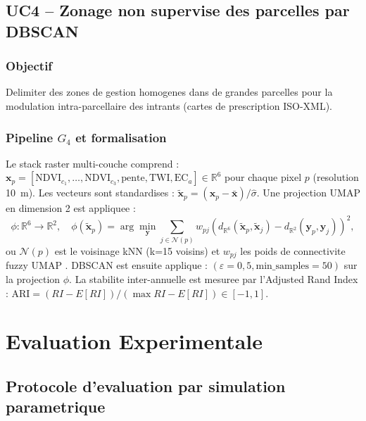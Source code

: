 \documentclass[12pt,a4paper]{article}
\theoremstyle{plain}
\theoremstyle{definition}
\theoremstyle{remark}
\newcommand{\R}{\mathbb{R}}
\begin{document}
	\subsection{UC4 -- Zonage non supervise des parcelles par DBSCAN}
	\label{subsec:uc4}
	
	\subsubsection{Objectif}
	
	Delimiter des zones de gestion homogenes dans de grandes parcelles
	pour la modulation intra-parcellaire des intrants (cartes de
	prescription ISO-XML).
	
	\subsubsection{Pipeline $G_4$ et formalisation}
	
	Le stack raster multi-couche comprend :
	$\bm{x}_p = [\text{NDVI}_{c_1}, \ldots, \text{NDVI}_{c_3},
	\text{pente}, \text{TWI}, \text{EC}_a] \in \R^6$
	pour chaque pixel $p$ (resolution 10~m).
	Les vecteurs sont standardises :
	$\tilde{\bm{x}}_p = (\bm{x}_p - \bar{\bm{x}}) / \hat\sigma$.
	Une projection UMAP en dimension 2 est appliquee :
	\begin{equation}
		\phi : \R^6 \to \R^2, \quad
		\phi(\tilde{\bm{x}}_p) = \arg\min_{\bm{y}}
		\sum_{j \in \mathcal{N}(p)} w_{pj} (d_{\R^6}(\tilde{\bm{x}}_p,
		\tilde{\bm{x}}_j) - d_{\R^2}(\bm{y}_p, \bm{y}_j))^2,
		\label{eq:umap}
	\end{equation}
	ou $\mathcal{N}(p)$ est le voisinage kNN (k=15 voisins) et
	$w_{pj}$ les poids de connectivite fuzzy UMAP \cite{umap_paper}.
	DBSCAN est ensuite applique :
	$(\varepsilon=0{,}5, \text{min\_samples}=50)$ sur la projection $\phi$.
	La stabilite inter-annuelle est mesuree par l'Adjusted Rand Index :
	$\text{ARI} = (RI - E[RI]) / (\max RI - E[RI]) \in [-1,1]$.
	
	\section{Evaluation Experimentale}
	\label{sec:evaluation}
	
	\subsection{Protocole d'evaluation par simulation parametrique}
	\label{subsec:protocole}
	
\end{document}
